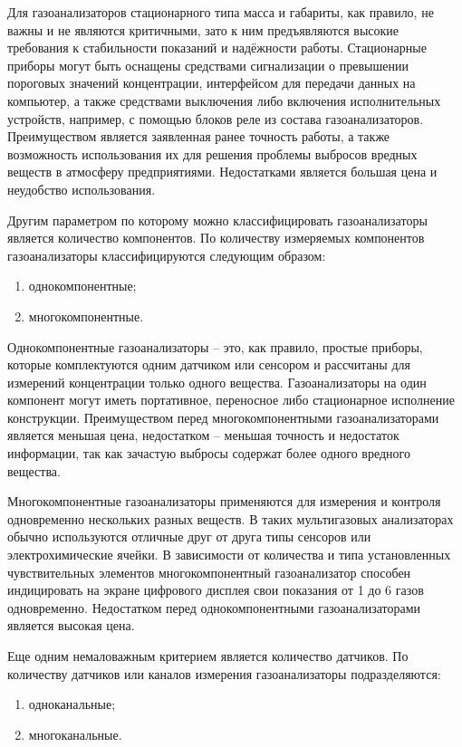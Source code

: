 \documentclass[14pt, a4paper]{extreport}
\begin{document}
	Для газоанализаторов стационарного типа масса и габариты, как правило, не важны и не являются критичными, зато к ним предъявляются высокие требования к стабильности показаний и надёжности работы. Стационарные приборы могут быть оснащены средствами сигнализации о превышении пороговых значений концентрации, интерфейсом для передачи данных на компьютер, а также средствами выключения либо включения исполнительных устройств, например, с помощью блоков реле из состава газоанализаторов. Преимуществом является заявленная ранее точность работы, а также возможность использования их для решения проблемы выбросов вредных веществ в атмосферу предприятиями. Недостатками является большая цена и неудобство использования.
	
	Другим параметром по которому можно классифицировать газоанализаторы является количество компонентов. По количеству измеряемых компонентов газоанализаторы классифицируются следующим образом:
	\begin{enumerate}[label={\arabic*)}]
		\item однокомпонентные;
		\item многокомпонентные.
	\end{enumerate}
	
	Однокомпонентные газоанализаторы -- это, как правило, простые приборы, которые комплектуются одним датчиком или сенсором и рассчитаны для измерений концентрации только одного вещества. Газоанализаторы на один компонент могут иметь портативное, переносное либо стационарное исполнение конструкции. Преимуществом перед многокомпонентными газоанализаторами является меньшая цена, недостатком -- меньшая точность и недостаток информации, так как зачастую выбросы содержат более одного вредного вещества.
	
	Многокомпонентные газоанализаторы применяются для измерения и контроля одновременно нескольких разных веществ. В таких мультигазовых анализаторах обычно используются отличные друг от друга типы сенсоров или электрохимические ячейки. В зависимости от количества и типа установленных чувствительных элементов многокомпонентный газоанализатор способен индицировать на экране цифрового дисплея свои показания от 1 до 6 газов одновременно. Недостатком перед однокомпонентными газоанализаторами является высокая цена.
	
	Еще одним немаловажным критерием является количество датчиков. По количеству датчиков или каналов измерения газоанализаторы подразделяются:
	\begin{enumerate}[label={\arabic*)}]
		\item одноканальные;
		\item многоканальные.
	\end{enumerate}
	
\end{document}
